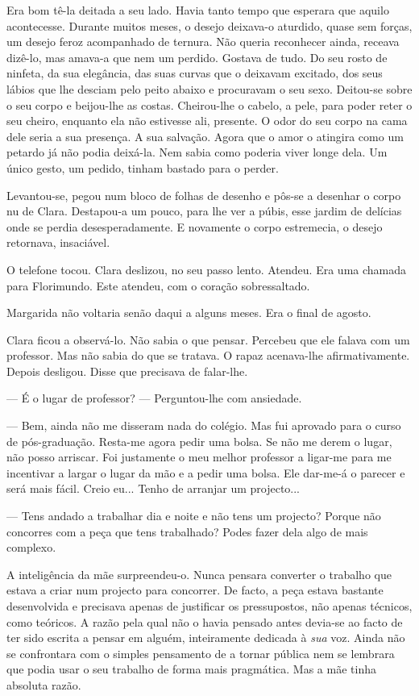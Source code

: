 Era bom tê-la deitada a seu lado. Havia tanto tempo que esperara que
aquilo acontecesse. Durante muitos meses, o desejo deixava-o aturdido,
quase sem forças, um desejo feroz acompanhado de ternura. Não queria
reconhecer ainda, receava dizê-lo, mas amava-a que nem um perdido.
Gostava de tudo. Do seu rosto de ninfeta, da sua elegância, das suas
curvas que o deixavam excitado, dos seus lábios que lhe desciam pelo
peito abaixo e procuravam o seu sexo. Deitou-se sobre o seu corpo e
beijou-lhe as costas. Cheirou-lhe o cabelo, a pele, para poder reter o
seu cheiro, enquanto ela não estivesse ali, presente. O odor do seu
corpo na cama dele seria a sua presença. A sua salvação. Agora que o
amor o atingira como um petardo já não podia deixá-la. Nem sabia como
poderia viver longe dela. Um único gesto, um pedido, tinham bastado para
o perder.

Levantou-se, pegou num bloco de folhas de desenho e pôs-se a desenhar o
corpo nu de Clara. Destapou-a um pouco, para lhe ver a púbis, esse
jardim de delícias onde se perdia desesperadamente. E novamente o corpo
estremecia, o desejo retornava, insaciável.

O telefone tocou. Clara deslizou, no seu passo lento. Atendeu. Era uma
chamada para Florimundo. Este atendeu, com o coração sobressaltado.

Margarida não voltaria senão daqui a alguns meses. Era o final de
agosto.

Clara ficou a observá-lo. Não sabia o que pensar. Percebeu que ele
falava com um professor. Mas não sabia do que se tratava. O rapaz
acenava-lhe afirmativamente. Depois desligou. Disse que precisava de
falar-lhe.

--- É o lugar de professor? --- Perguntou-lhe com ansiedade.

--- Bem, ainda não me disseram nada do colégio. Mas fui aprovado para o
curso de pós-graduação. Resta-me agora pedir uma bolsa. Se não me derem
o lugar, não posso arriscar. Foi justamente o meu melhor professor a
ligar-me para me incentivar a largar o lugar da mão e a pedir uma bolsa.
Ele dar-me-á o parecer e será mais fácil. Creio eu... Tenho de arranjar
um projecto...

--- Tens andado a trabalhar dia e noite e não tens um projecto? Porque não
concorres com a peça que tens trabalhado? Podes fazer dela algo de mais
complexo.

A inteligência da mãe surpreendeu-o. Nunca pensara converter o trabalho
que estava a criar num projecto para concorrer. De facto, a peça estava
bastante desenvolvida e precisava apenas de justificar os pressupostos,
não apenas técnicos, como teóricos. A razão pela qual não o havia
pensado antes devia-se ao facto de ter sido escrita a pensar em alguém,
inteiramente dedicada à \emph{sua} voz. Ainda não se confrontara com o
simples pensamento de a tornar pública nem se lembrara que podia usar o
seu trabalho de forma mais pragmática. Mas a mãe tinha absoluta razão.

